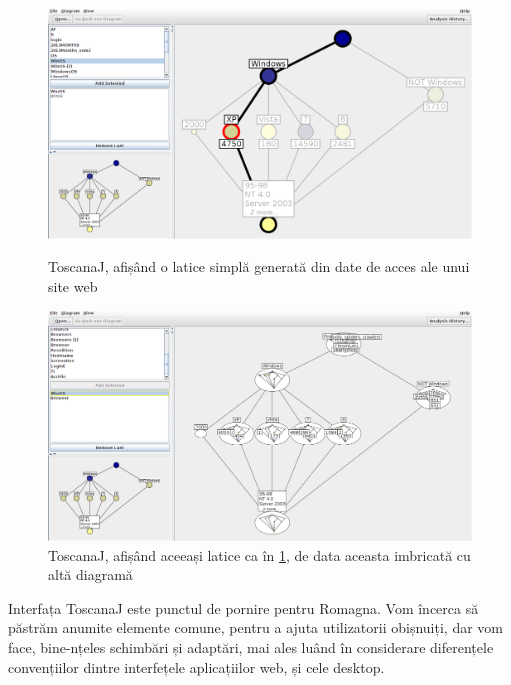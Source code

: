 \documentclass[12pt, a4paper, twoside, romanian]{teza-upb}
\begin{document}
        \begin{figure}[h]
          \centering
          \includegraphics[width=\textwidth, natwidth=1366, natheight=744]{toscanaj-1.png} \\ 
          \caption{ToscanaJ, afișând o latice simplă generată din date de acces ale unui site web}
          \label{screenshot:toscana-1}
        \end{figure}
        \begin{figure}[h]
          \centering
          \includegraphics[width=\textwidth, natwidth=1366, natheight=744]{toscanaj-2.png}
          \caption{ToscanaJ, afișând aceeași latice ca în \ref{screenshot:toscana-1}, de data aceasta imbricată cu altă diagramă}
          \label{screenshot:toscana-2}
        \end{figure}

        Interfața ToscanaJ este punctul de pornire pentru Romagna. Vom încerca să păstrăm anumite elemente comune, pentru a ajuta utilizatorii obișnuiți, dar vom face, bine-nțeles schimbări și adaptări, mai ales luând în considerare diferențele convențiilor dintre interfețele aplicațiilor web, și cele desktop.
\end{document}
